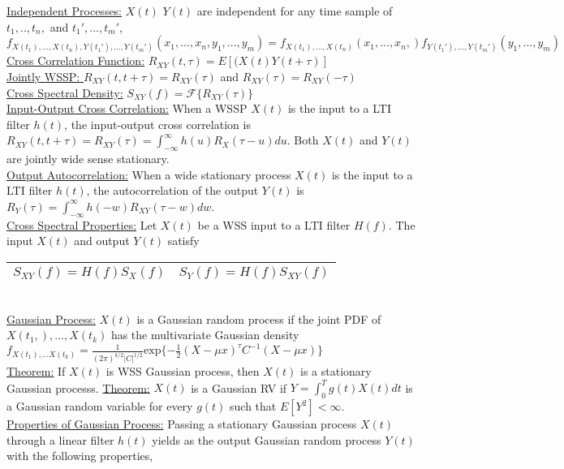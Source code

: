 \documentclass{article}
\begin{document}
	\underline{Independent Processes:} $X(t)$ $Y(t)$ are independent for any time sample of $t_1, .., t_n,$ and $t_1', ..., t_m'$, 
	\\
	$f_{X(t_1), ...,X(t_n),Y(t_1'), ...,Y(t_m' )}(x_1, ..., x_n, y_1, ..., y_m) = f_{X(t_1), ...,X(t_n)}(x_1, ..., x_n,)f_{Y(t_1'), ...,Y(t_m' )}(y_1, ..., y_m)$
	\\
	\underline{Cross Correlation Function:} $R_{XY}(t, \tau) = E[(X(t)Y(t + \tau)]$
	\\
	\underline{Jointly WSSP: } $R_{XY}(t, t + \tau) = R_{XY}(\tau)$ and $R_{XY}(\tau) = R_{XY}(-\tau)$
	\\
	\underline{Cross Spectral Density:} $S_{XY}(f) = \mathcal{F}\{R_{XY}(\tau)\}$
	\\
	\underline{Input-Output Cross Correlation:} When a WSSP $X(t)$ is the input to a LTI filter $h(t)$, the input-output cross correlation is $R_{XY}(t, t + \tau) = R_{XY}(\tau) = \int_{-\infty}^{\infty}h(u)R_X(\tau - u)du$. Both $X(t)$ and $Y(t)$ are jointly wide sense stationary.
	\\
	\underline{Output Autocorrelation:} When a wide stationary process $X(t)$ is the input to a LTI filter $h(t)$, the autocorrelation of the output $Y(t)$ is $R_Y(\tau) = \int_{-\infty}^{\infty}h(-w)R_{XY}(\tau - w)dw$.
	\\
	\underline{Cross Spectral Properties:} Let $X(t)$ be a WSS input to a LTI filter $H(f)$. The input $X(t)$ and output $Y(t)$ satisfy
	\\
	\begin{tabular}{|c|c|} 
		\hline
		$S_{XY}(f) = H(f)S_X(f)$ & $S_Y(f) = H(f)S_{XY}(f)$ \\
		\hline
	\end{tabular}
	\\
	\underline{Gaussian Process:} $X(t)$ is a Gaussian random process if the joint PDF of $X(t_1,), ..., X(t_k)$ has the multivariate Gaussian density $f_{X(t_1), ... X(t_k)} = \frac{1}{(2\pi)^{k/2}\vert C\vert^{1/2}}\text{exp}\{-\frac{1}{2}(X - \mu x)^{\tau}C^{-1}(X - \mu x)\}$
	\\
	\underline{Theorem:} If $X(t)$ is WSS Gaussian process, then $X(t)$ is a stationary Gaussian processs.
	\underline{Theorem:} $X(t)$ is a Gaussian RV if $Y = \int_{0}^Tg(t)X(t)dt$ is a Gaussian random variable for every $g(t)$ such that $E[Y^2] < \infty$.
	\\
	\underline{Properties of Gaussian Process:} Passing a stationary Gaussian process $X(t)$ through a linear filter $h(t)$ yields as the output Gaussian random process $Y(t)$ with the following properties,
\end{document}
